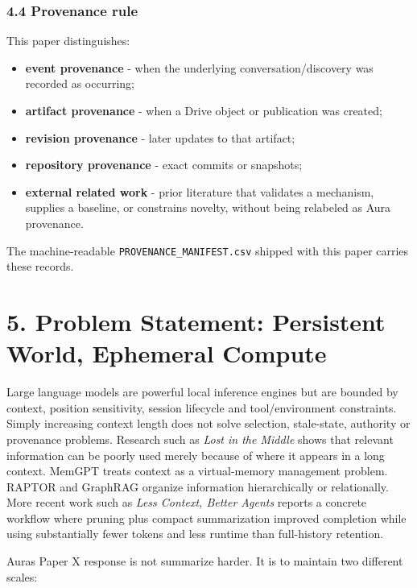 \documentclass[
  10pt,
  letterpaper,
]{article}
\providecommand{\tightlist}{%
  \setlength{\itemsep}{0pt}\setlength{\parskip}{0pt}}
\begin{document}
\subsubsection{4.4 Provenance rule}\label{44-provenance-rule}

This paper distinguishes:

\begin{itemize}
\tightlist
\item
  \textbf{event provenance} - when the underlying conversation/discovery
  was recorded as occurring;
\item
  \textbf{artifact provenance} - when a Drive object or publication was
  created;
\item
  \textbf{revision provenance} - later updates to that artifact;
\item
  \textbf{repository provenance} - exact commits or snapshots;
\item
  \textbf{external related work} - prior literature that validates a
  mechanism, supplies a baseline, or constrains novelty, without being
  relabeled as Aura provenance.
\end{itemize}

The machine-readable \nolinkurl{PROVENANCE_MANIFEST.csv} shipped with this
paper carries these records.

\section{5. Problem Statement: Persistent World, Ephemeral
Compute}\label{5-problem-statement-persistent-world-ephemeral-compute}

Large language models are powerful local inference engines but are
bounded by context, position sensitivity, session lifecycle and
tool/environment constraints. Simply increasing context length does not
solve selection, stale-state, authority or provenance problems. Research
such as \emph{Lost in the Middle} shows that relevant information can be
poorly used merely because of where it appears in a long context. MemGPT
treats context as a virtual-memory management problem. RAPTOR and
GraphRAG organize information hierarchically or relationally. More
recent work such as \emph{Less Context, Better Agents} reports a
concrete workflow where pruning plus compact summarization improved
completion while using substantially fewer tokens and less runtime than
full-history retention.

Aura\textquotesingle s Paper X response is not
\textquotesingle summarize harder.\textquotesingle{} It is to maintain
two different scales:
\end{document}
